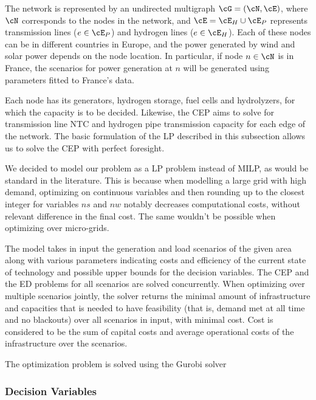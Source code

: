 The network is represented by an undirected multigraph \(\cG = (\cN, \cE)\), where \(\cN\) corresponds to the nodes in the network, and \(\cE = \cE_H \cup \cE_P\) represents transmission lines (\(e \in \cE_P\)) and hydrogen lines (\(e \in \cE_H\)).
Each of these nodes can be in different countries in Europe, and the power generated by wind and solar power depends on the node location. 
In particular, if node \(n \in \cN\) is in France, the scenarios for power generation at \(n\) will be generated using parameters fitted to France's data.

Each node has its generators, hydrogen storage, fuel cells and hydrolyzers, for which the capacity is to be decided. 
Likewise, the CEP aims to solve for transmission line NTC and hydrogen pipe transmission capacity for each edge of the network. 
The basic formulation of the LP described in this subsection allows us to solve the CEP with perfect foresight. 

We decided to model our problem as a LP problem instead of MILP, as would be standard in the literature. 
This is because when modelling a large grid with high demand, optimizing on continuous variables and then rounding up to the closest integer for variables $ns$ and $nw$ notably decreases computational costs, without relevant difference in the final cost. 
The same wouldn't be possible when optimizing over micro-grids.

The model takes in input the generation and load scenarios of the given area along with various parameters indicating costs and efficiency of the current state of technology and possible upper bounds for the decision variables. 
The CEP and the ED problems for all scenarios are solved concurrently. 
When optimizing over multiple scenarios jointly, the solver returns the minimal amount of infrastructure and capacities that is needed to have feasibility (that is, demand met at all time and no blackouts) over all scenarios in input, with minimal cost. 
Cost is considered to be the sum of capital costs and average operational costs of the infrastructure over the scenarios.

The optimization problem is solved using the Gurobi solver %



\subsubsection{Decision Variables}

